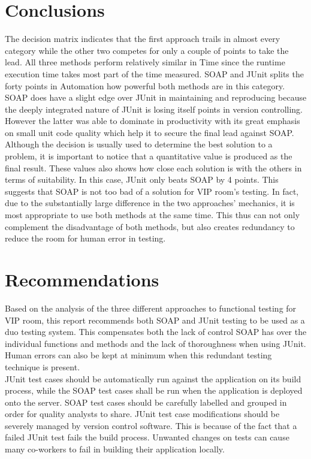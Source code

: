\documentclass[12pt]{article}
\begin{document}
\newpage
\section{Conclusions}
The decision matrix indicates that the first approach trails in almost every category while the other two competes for only a couple of points to take the lead. All three methods perform relatively similar in Time since the runtime execution time takes most part of the time measured. SOAP and JUnit splits the forty points in Automation how powerful both methods are in this category. SOAP does have a slight edge over JUnit in maintaining and reproducing because the deeply integrated nature of JUnit is losing itself points in version controlling.  However the latter was able to dominate in productivity with its great emphasis on small unit code quality which help it to secure the final lead against SOAP.\\

Although the decision is usually used to determine the best solution to a problem, it is important to notice that a quantitative value is produced as the final result. These values also shows how close each solution is with the others in terms of suitability. In this case, JUnit only beats SOAP by 4 points. This suggests that SOAP is not too bad of a solution for VIP room's testing. In fact, due to the substantially large difference in the two approaches' mechanics, it is most appropriate to use both methods at the same time. This thus can not only complement the disadvantage of both methods, but also creates redundancy to reduce the room for human error in testing.\\

\newpage
\section{Recommendations}
Based on the analysis of the three different approaches to functional testing for VIP room, this report recommends both SOAP and JUnit testing to be used as a duo testing system. This compensates both the lack of control SOAP has over the individual functions and methods and the lack of thoroughness when using JUnit. Human errors can also be kept at minimum when this redundant testing technique is present.\\

JUnit test cases should be automatically run against the application on its build process, while the SOAP test cases shall be run when the application is deployed onto the server. SOAP test cases should be carefully labelled and grouped in order for quality analysts to share. JUnit test case modifications should be severely managed by version control software. This is because of the fact that a failed JUnit test fails the build process. Unwanted changes on tests can cause many co-workers to fail in building their application locally.\\
\end{document}
